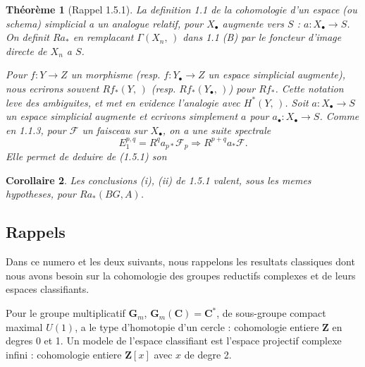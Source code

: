 \documentclass[11pt,a4paper]{article}
\theoremstyle{plain}
\newtheorem{theorem}{Th\'eor\`eme}[section]
\newtheorem{corollary}[theorem]{Corollaire}
\theoremstyle{definition}
\begin{document}
\begin{theorem}[Rappel 1.5.1]
La definition 1.1 de la cohomologie d'un espace (ou schema) simplicial a un analogue relatif, pour $X_\bullet$ augmente vers $S$ : $a : X_\bullet \to S$. On definit $R a_*$ en remplacant $\Gamma(X_n, \,)$ dans 1.1 (B) par le foncteur d'image directe de $X_n$ a $S$.

Pour $f : Y \to Z$ un morphisme (resp. $f : Y_\bullet \to Z$ un espace simplicial augmente), nous ecrirons souvent $R f_*(Y, \,)$ (resp. $R f_*(Y_\bullet, \,)$) pour $R f_*$. Cette notation leve des ambiguites, et met en evidence l'analogie avec $H^*(Y, \,)$. Soit $a : X_\bullet \to S$ un espace simplicial augmente et ecrivons simplement $a$ pour $a_\bullet : X_\bullet \to S$. Comme en 1.1.3, pour $\mathscr{F}$ un faisceau sur $X_\bullet$, on a une suite spectrale
\begin{equation}\label{1.5.3}
E_1^{p,q} = R^q a_{p*} \mathscr{F}_p \Rightarrow R^{p+q} a_* \mathscr{F}.
\end{equation}
Elle permet de deduire de (1.5.1) son
\end{theorem}

\begin{corollary}\label{1.5.4}
Les conclusions (i), (ii) de 1.5.1 valent, sous les memes hypotheses, pour $R a_*(BG, A)$.
\end{corollary}

\subsection{Rappels}\label{1.6}

Dans ce numero et les deux suivants, nous rappelons les resultats classiques dont nous avons besoin sur la cohomologie des groupes reductifs complexes et de leurs espaces classifiants.

Pour le groupe multiplicatif $\mathbf{G}_m$, $\mathbf{G}_m(\mathbf{C}) = \mathbf{C}^*$, de sous-groupe compact maximal $U(1)$, a le type d'homotopie d'un cercle : cohomologie entiere $\mathbf{Z}$ en degres 0 et 1. Un modele de l'espace classifiant est l'espace projectif complexe infini : cohomologie entiere $\mathbf{Z}[x]$ avec $x$ de degre 2.
\end{document}
